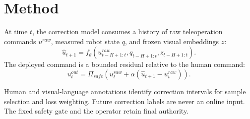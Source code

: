 \section{Method}
\label{sec:method}

At time $t$, the correction model consumes a history of raw teleoperation
commands $u^{raw}$, measured robot state $q$, and frozen visual embeddings $z$:
\begin{equation}
  \hat{u}_{t+1} = f_\theta(u^{raw}_{t-H+1:t}, q_{t-H+1:t}, z_{t-H+1:t}).
\end{equation}
The deployed command is a bounded residual relative to the human command:
\begin{equation}
  u^{out}_t = \Pi_{safe}\left(u^{raw}_t + \alpha(\hat{u}_{t+1} - u^{raw}_t)\right).
\end{equation}

Human and visual-language annotations identify correction intervals for sample
selection and loss weighting. Future correction labels are never an online
input. The fixed safety gate and the operator retain final authority.
